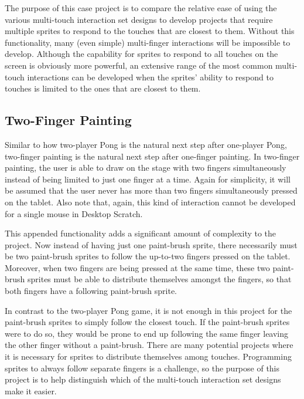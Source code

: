 The purpose of this case project is to compare the relative ease of using the various multi-touch interaction set designs to develop projects that require multiple sprites to respond to the touches that are closest to them. Without this functionality, many (even simple) multi-finger interactions will be impossible to develop. Although the capability for sprites to respond to all touches on the screen is obviously more powerful, an extensive range of the most common multi-touch interactions can be developed when the sprites' ability to respond to touches is limited to the ones that are closest to them.

\subsection{Two-Finger Painting}
Similar to how two-player Pong is the natural next step after one-player Pong, two-finger painting is the natural next step after one-finger painting. In two-finger painting, the user is able to draw on the stage with two fingers simultaneously instead of being limited to just one finger at a time. Again for simplicity, it will be assumed that the user never has more than two fingers simultaneously pressed on the tablet. Also note that, again, this kind of interaction cannot be developed for a single mouse in Desktop Scratch.

This appended functionality adds a significant amount of complexity to the project. Now instead of having just one paint-brush sprite, there necessarily must be two paint-brush sprites to follow the up-to-two fingers pressed on the tablet. Moreover, when two fingers are being pressed at the same time, these two paint-brush sprites must be able to distribute themselves amongst the fingers, so that both fingers have a following paint-brush sprite. 

In contrast to the two-player Pong game, it is not enough in this project for the paint-brush sprites to simply follow the closest touch. If the paint-brush sprites were to do so, they would be prone to end up following the same finger leaving the other finger without a paint-brush. There are many potential projects where it is necessary for sprites to distribute themselves among touches. Programming sprites to always follow separate fingers is a challenge, so the purpose of this project is to help distinguish which of the multi-touch interaction set designs make it easier.  

